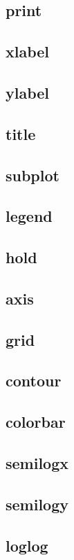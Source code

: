\documentclass[12pt,parskip=full]{article}
\numberwithin{subsection}{section}
\begin{document}
		\subsection{print}
		\subsection{xlabel}
		\subsection{ylabel}
		\subsection{title}
		\subsection{subplot}
		\subsection{legend}
		\subsection{hold}
		\subsection{axis}
		\subsection{grid}
		\subsection{contour}
		\subsection{colorbar}
		\subsection{semilogx}
		\subsection{semilogy}
		\subsection{loglog}
		
\end{document}
